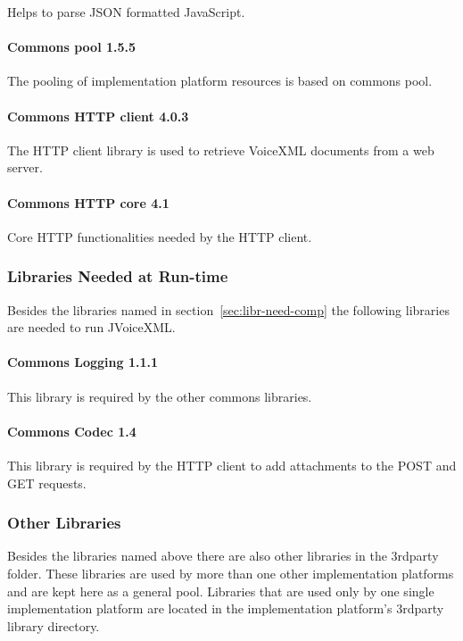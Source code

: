 \documentclass[11pt,a4paper]{article}
\begin{document}
Helps to parse JSON formatted JavaScript.

\paragraph{Commons pool 1.5.5}

The pooling of implementation platform resources is based on commons
pool.

\paragraph{Commons HTTP client 4.0.3}

The HTTP client library is used to retrieve VoiceXML documents from a web
server.

\paragraph{Commons HTTP core 4.1}

Core HTTP functionalities needed by the HTTP client.

\subsubsection{Libraries Needed at Run-time}

Besides the libraries named in section~\ref{sec:libr-need-comp} the following
libraries are needed to run JVoiceXML.

\paragraph{Commons Logging 1.1.1}
\label{sec:commons-logging}

This library is required by the other commons libraries.

\paragraph{Commons Codec 1.4}
\label{sec:commons-codec}

This library is required by the HTTP client to add attachments to the POST and
GET requests.

\subsubsection{Other Libraries}

Besides the libraries named above there are also other libraries in the
3rdparty folder. These libraries are used by more than one other implementation
platforms and are kept here as a general pool. Libraries that are used only by
one single implementation platform are located in the implementation platform's
3rdparty library directory.
\end{document}
